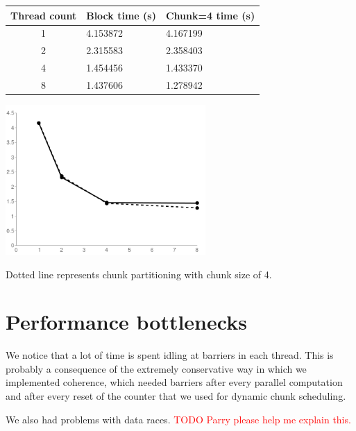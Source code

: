 \documentclass{article}[12pt;letterpaper]
\newcommand{\todo}[1]{\textcolor{red}{TODO #1}}
\begin{document}
\begin{center}
\begin{tabular}{c l l}
Thread count & Block time (s) & Chunk=4 time (s) \\
\hline{}
1 & 4.153872 & 4.167199 \\
2 & 2.315583 & 2.358403 \\
4 & 1.454456 & 1.433370 \\
8 & 1.437606 & 1.278942
\end{tabular}

\includegraphics[width=3in]{a2_sec3_1.png}
\end{center}

Dotted line represents chunk partitioning with chunk size of 4.

\section{Performance bottlenecks}

We notice that a lot of time is spent idling at barriers in each thread. This
is probably a consequence of the extremely conservative way in which we
implemented coherence, which needed barriers after every parallel computation
and after every reset of the counter that we used for dynamic chunk scheduling.

We also had problems with data races. \todo{Parry please help me explain this.}
\end{document}
